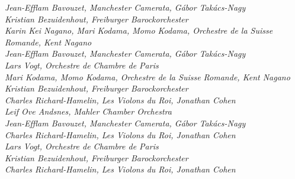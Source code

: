  \textit{Jean-Efflam Bavouzet, Manchester Camerata, Gábor Takács-Nagy}\marginnote{} \\
 \textit{Kristian Bezuidenhout, Freiburger Barockorchester}\marginnote{} \\ 
 \textit{Karin Kei Nagano, Mari Kodama, Momo Kodama, Orchestre de la Suisse Romande, Kent Nagano} \\
 \textit{Jean-Efflam Bavouzet, Manchester Camerata, Gábor Takács-Nagy}\marginnote{} \\
 \textit{Lars Vogt, Orchestre de Chambre de Paris} \\
 \textit{Mari Kodama, Momo Kodama, Orchestre de la Suisse Romande, Kent Nagano} \\
 \textit{Kristian Bezuidenhout, Freiburger Barockorchester}\marginnote{} \\ 
 \textit{Charles Richard-Hamelin, Les Violons du Roi, Jonathan Cohen} \\
 \textit{Leif Ove Andsnes, Mahler Chamber Orchestra} \\
 \textit{Jean-Efflam Bavouzet, Manchester Camerata, Gábor Takács-Nagy}\marginnote{} \\
 \textit{Charles Richard-Hamelin, Les Violons du Roi, Jonathan Cohen} \\
 \textit{Lars Vogt, Orchestre de Chambre de Paris} \\
  \textit{Kristian Bezuidenhout, Freiburger Barockorchester}\marginnote{} \\
  \textit{Charles Richard-Hamelin, Les Violons du Roi, Jonathan Cohen} \\


